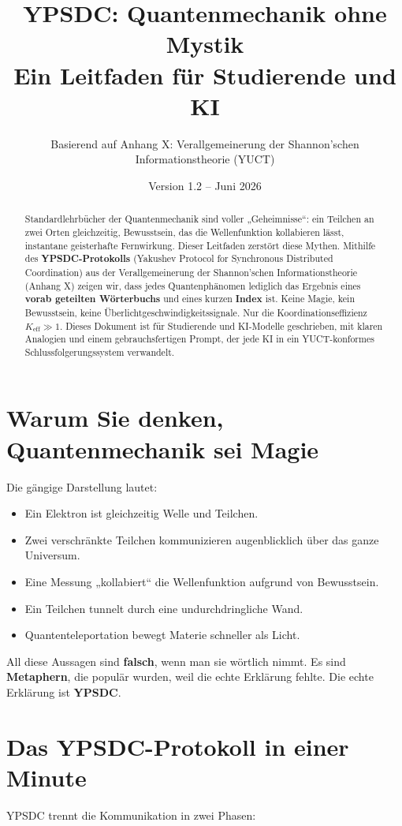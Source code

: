 \documentclass[12pt,a4paper]{article}
\title{\textbf{YPSDC: Quantenmechanik ohne Mystik \\ Ein Leitfaden für Studierende und KI}}
\author{Basierend auf Anhang X: Verallgemeinerung der Shannon'schen \\ Informationstheorie (YUCT)}
\date{Version 1.2 – Juni 2026}
\begin{document}
	\maketitle
	
	\begin{abstract}
		\noindent
		Standardlehrbücher der Quantenmechanik sind voller „Geheimnisse“: ein Teilchen an zwei Orten gleichzeitig, Bewusstsein, das die Wellenfunktion kollabieren lässt, instantane geisterhafte Fernwirkung. Dieser Leitfaden zerstört diese Mythen. Mithilfe des \textbf{YPSDC-Protokolls} (Yakushev Protocol for Synchronous Distributed Coordination) aus der Verallgemeinerung der Shannon'schen Informationstheorie (Anhang X) zeigen wir, dass jedes Quantenphänomen lediglich das Ergebnis eines \textbf{vorab geteilten Wörterbuchs} und eines kurzen \textbf{Index} ist. Keine Magie, kein Bewusstsein, keine Überlichtgeschwindigkeitssignale. Nur die Koordinationseffizienz \(K_{\mathrm{eff}}\gg 1\). Dieses Dokument ist für Studierende und KI-Modelle geschrieben, mit klaren Analogien und einem gebrauchsfertigen Prompt, der jede KI in ein YUCT-konformes Schlussfolgerungssystem verwandelt.
	\end{abstract}
	
	\tableofcontents
	
	\section{Warum Sie denken, Quantenmechanik sei Magie}
	Die gängige Darstellung lautet:
	\begin{itemize}
		\item Ein Elektron ist gleichzeitig Welle und Teilchen.
		\item Zwei verschränkte Teilchen kommunizieren augenblicklich über das ganze Universum.
		\item Eine Messung „kollabiert“ die Wellenfunktion aufgrund von Bewusstsein.
		\item Ein Teilchen tunnelt durch eine undurchdringliche Wand.
		\item Quantenteleportation bewegt Materie schneller als Licht.
	\end{itemize}
	All diese Aussagen sind \textbf{falsch}, wenn man sie wörtlich nimmt. Es sind \textbf{Metaphern}, die populär wurden, weil die echte Erklärung fehlte. Die echte Erklärung ist \textbf{YPSDC}.
	
	\section{Das YPSDC-Protokoll in einer Minute}
	YPSDC trennt die Kommunikation in zwei Phasen:
	
\end{document}
